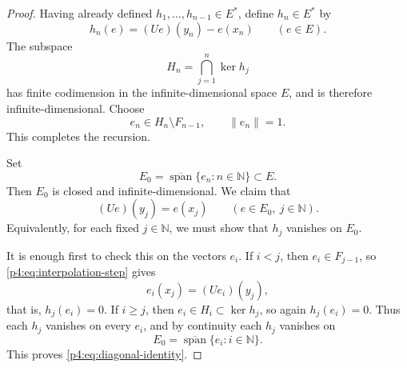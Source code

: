 \documentclass[11pt,reqno]{amsart}
\makeatletter
\theoremstyle{plain}
\theoremstyle{definition}
\newcommand{\N}{\mathbb N}
\newcounter{problempaper}
\newenvironment{problempaperbody}{%
  \setcounter{subsection}{0}%
  \setcounter{subsubsection}{0}%
  \setcounter{paragraph}{0}%
  \renewcommand{\thesubsection}{\arabic{subsection}}%
  \renewcommand{\thesubsubsection}{\thesubsection.\arabic{subsubsection}}%
  \renewcommand{\theparagraph}{\thesubsubsection.\arabic{paragraph}}%
  \let\problem@outersection\section
  \let\problem@outersubsection\subsection
  \let\problem@outersubsubsection\subsubsection
  \let\problem@outerparagraph\paragraph
  \let\section\problem@papersection
  \let\subsection\problem@papersubsection
  \let\subsubsection\problem@papersubsubsection
}{%
  \let\section\problem@outersection
  \let\subsection\problem@outersubsection
  \let\subsubsection\problem@outersubsubsection
  \let\paragraph\problem@outerparagraph
}
\newcommand{\problem@target}[2]{%
  \hypertarget{problem-\theproblempaper-#1-#2}{}%
}
\newcommand{\problem@paperheading}[3]{%
  \par\bigskip
  \problem@target{#1}{#2}%
  \noindent{\large\bfseries #2.\quad #3\par}%
  \nobreak\smallskip
}
\newcommand{\problem@papersubheading}[3]{%
  \par\medskip
  \problem@target{#1}{#2}%
  \noindent{\normalsize\bfseries #2.\quad #3\par}%
  \nobreak\smallskip
}
\newcommand{\problem@papersubsubheading}[3]{%
  \par\smallskip
  \problem@target{#1}{#2}%
  \noindent{\normalsize\itshape #2.\quad #3.\ }%
}
\def\problem@papersection{%
  \@ifstar{\problem@papersectionstar}{\problem@papersectionnostar}%
}
\def\problem@papersectionstar#1{%
  \par\bigskip\noindent{\large\bfseries #1\par}\nobreak\smallskip
}
\def\problem@papersectionnostar#1{%
  \refstepcounter{subsection}%
  \setcounter{subsubsection}{0}%
  \setcounter{paragraph}{0}%
  \problem@paperheading{section}{\thesubsection}{#1}%
  \problem@writecontentsline{section}{\thesubsection}{#1}%
}
\def\problem@papersubsection{%
  \@ifstar{\problem@papersubsectionstar}{\problem@papersubsectionnostar}%
}
\def\problem@papersubsectionstar#1{%
  \par\medskip\noindent{\normalsize\bfseries #1\par}\nobreak\smallskip
}
\def\problem@papersubsectionnostar#1{%
  \refstepcounter{subsubsection}%
  \setcounter{paragraph}{0}%
  \problem@papersubheading{subsection}{\thesubsubsection}{#1}%
  \problem@writecontentsline{subsection}{\thesubsubsection}{#1}%
}
\def\problem@papersubsubsection{%
  \@ifstar{\problem@papersubsubsectionstar}{\problem@papersubsubsectionnostar}%
}
\def\problem@papersubsubsectionstar#1{%
  \par\smallskip\noindent{\normalsize\itshape #1.\ }%
}
\def\problem@papersubsubsectionnostar#1{%
  \refstepcounter{paragraph}%
  \problem@papersubsubheading{subsubsection}{\theparagraph}{#1}%
  \problem@writecontentsline{subsubsection}{\theparagraph}{#1}%
}
\newcommand{\problem@writecontentsline}[3]{%
  \begingroup
  \protected@write\@auxout{}{%
    \string\problemcontentsentry{\theproblempaper}{#1}{#2}{#3}{\thepage}%
  }%
  \endgroup
}
\newcommand{\problemcontentsentry}[5]{%
  \@ifundefined{problemcontents@#1}{%
    \expandafter\gdef\csname problemcontents@#1\endcsname{}%
  }{}%
  \expandafter\g@addto@macro\csname problemcontents@#1\endcsname{%
    \problemcontentsline{#1}{#2}{#3}{#4}{#5}%
  }%
}
\newcommand{\problemcontentslink}[4]{%
  \hyperlink{problem-#1-#2-#3}{#4}%
}
\newcommand{\problemcontentsline}[5]{%
  \ifstrequal{#2}{section}{%
    \par\noindent
    \problemcontentslink{#1}{#2}{#3}{\makebox[2.5em][l]{#3}#4}%
    \nobreak\dotfill
    \problemcontentslink{#1}{#2}{#3}{#5}\par
  }{%
    \ifstrequal{#2}{subsection}{%
      \par\noindent\hspace*{1.5em}%
      \problemcontentslink{#1}{#2}{#3}{\makebox[3.5em][l]{#3}#4}%
      \nobreak\dotfill
      \problemcontentslink{#1}{#2}{#3}{#5}\par
    }{%
      \par\noindent\hspace*{3em}%
      \problemcontentslink{#1}{#2}{#3}{\makebox[4.5em][l]{#3}#4}%
      \nobreak\dotfill
      \problemcontentslink{#1}{#2}{#3}{#5}\par
    }%
  }%
}
\makeatother
\begin{document}
\begin{problempaperbody}
\begin{proof}
Having already defined $h_1, \dots, h_{n-1} \in E^*$, define $h_n\in E^*$ by
\begin{equation*}
        h_n(e)=(Ue)(y_n)-e(x_n) \qquad(e\in E).
\end{equation*}
The subspace
\begin{equation*}
        H_n=\bigcap_{j=1}^{n}\ker h_j
\end{equation*}
has finite codimension in the infinite-dimensional space $E$, and is therefore infinite-dimensional. Choose
\begin{equation*}
        e_n\in H_n\setminus F_{n-1}, \qquad \|e_n\|=1.
\end{equation*}
This completes the recursion.

Set
\begin{equation*}
        E_0=\overline{\operatorname{span}}\{e_n:n\in\N\}\subset E.
\end{equation*}
Then $E_0$ is closed and infinite-dimensional. We claim that
\begin{equation}
\label{p4:eq:diagonal-identity}
        (Ue)(y_j)=e(x_j) \qquad(e\in E_0,\ j\in\N).
\end{equation}
Equivalently, for each fixed $j\in\N$, we must show that $h_j$ vanishes on $E_0$.

It is enough first to check this on the vectors $e_i$. If $i<j$, then $e_i\in F_{j-1}$, so \eqref{p4:eq:interpolation-step} gives
\begin{equation*}
        e_i(x_j)=(Ue_i)(y_j),
\end{equation*}
that is, $h_j(e_i)=0$. If $i\geq j$, then $e_i\in H_i\subset\ker h_j$, so again $h_j(e_i)=0$. Thus each $h_j$ vanishes on every $e_i$, and by continuity each $h_j$ vanishes on
\begin{equation*}
        E_0=\overline{\operatorname{span}}\{e_i:i\in\N\}.
\end{equation*}
This proves \eqref{p4:eq:diagonal-identity}.


\end{proof}
\end{problempaperbody}
\end{document}
